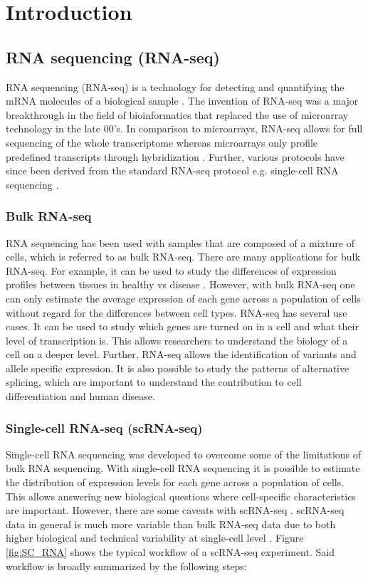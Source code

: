 

\chapter{Introduction}

\section{RNA sequencing (RNA-seq)}
RNA sequencing (RNA-seq) is a technology for detecting and quantifying the mRNA molecules of a biological sample \citep{rna_seq}. The invention of RNA-seq was a major breakthrough in the field of bioinformatics that replaced the use of microarray technology in the late 00's. In comparison to microarrays, RNA-seq allows for full sequencing of the whole transcriptome whereas microarrays only profile predefined transcripts through hybridization \citep{rna_seq_comparison}. Further, various protocols have since been derived from the standard RNA-seq protocol e.g. single-cell RNA sequencing \citep{rna_seq}.

\subsection{Bulk RNA-seq}
RNA sequencing has been used with samples that are composed of a mixture of cells, which is referred to as bulk RNA-seq. There are many applications for bulk RNA-seq. For example, it can be used to study the differences of expression profiles between tissues in healthy vs disease \citep{rna_seq}. However, with bulk RNA-seq one can only estimate the average expression of each gene across a population of cells without regard for the differences between cell types. RNA-seq has several use cases. It can be used to study which genes are turned on in a cell and what their level of transcription is. This allows researchers to understand the biology of a cell on a deeper level. Further, RNA-seq allows the identification of variants and allele specific expression. It is also possible to study the patterns of alternative splicing, which are important to understand the contribution to cell differentiation and human disease.

\subsection{Single-cell RNA-seq (scRNA-seq)}
Single-cell RNA sequencing was developed to overcome some of the limitations of bulk RNA sequencing. With single-cell RNA sequencing it is possible to estimate the distribution of expression levels for each gene across a population of cells. This allows answering new biological questions where cell-specific characteristics are important. However, there are some caveats with scRNA-seq \citep{scrna_seq}. scRNA-seq data in general is much more variable than bulk RNA-seq data due to both higher biological and technical variability at single-cell level \citep{scrna_seq}. Figure \ref{fig:SC_RNA} shows the typical workflow of a scRNA-seq experiment. Said workflow is broadly summarized by the following steps:


